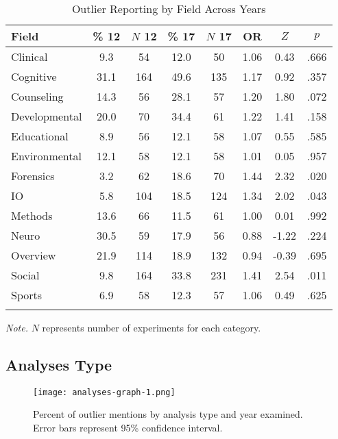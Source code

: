 \documentclass[english,,man]{apa6}
\theoremstyle{definition}
\theoremstyle{definition}
\theoremstyle{definition}
\theoremstyle{remark}
\begin{document}
\begin{table}[tbp]
\begin{center}
\begin{threeparttable}
\caption{\label{tab:info-table}Outlier Reporting by Field Across Years}
\begin{tabular}{lccccccc}
\toprule
Field & \% 12 & $N$ 12 & \% 17 & $N$ 17 & OR & $Z$ & $p$\\
\midrule
Clinical & 9.3 & 54 & 12.0 & 50 & 1.06 & 0.43 & .666\\
Cognitive & 31.1 & 164 & 49.6 & 135 & 1.17 & 0.92 & .357\\
Counseling & 14.3 & 56 & 28.1 & 57 & 1.20 & 1.80 & .072\\
Developmental & 20.0 & 70 & 34.4 & 61 & 1.22 & 1.41 & .158\\
Educational & 8.9 & 56 & 12.1 & 58 & 1.07 & 0.55 & .585\\
Environmental & 12.1 & 58 & 12.1 & 58 & 1.01 & 0.05 & .957\\
Forensics & 3.2 & 62 & 18.6 & 70 & 1.44 & 2.32 & .020\\
IO & 5.8 & 104 & 18.5 & 124 & 1.34 & 2.02 & .043\\
Methods & 13.6 & 66 & 11.5 & 61 & 1.00 & 0.01 & .992\\
Neuro & 30.5 & 59 & 17.9 & 56 & 0.88 & -1.22 & .224\\
Overview & 21.9 & 114 & 18.9 & 132 & 0.94 & -0.39 & .695\\
Social & 9.8 & 164 & 33.8 & 231 & 1.41 & 2.54 & .011\\
Sports & 6.9 & 58 & 12.3 & 57 & 1.06 & 0.49 & .625\\
\bottomrule
\addlinespace
\end{tabular}
\begin{tablenotes}[para]
\normalsize{\textit{Note.} $N$ represents number of experiments for each category.}
\end{tablenotes}
\end{threeparttable}
\end{center}
\end{table}

\subsection{Analyses Type}\label{analyses-type}

\begin{figure}
\centering
\texttt{[image: analyses-graph-1.png]}
\caption{\label{fig:analyses-graph}Percent of outlier mentions by analysis
type and year examined. Error bars represent 95\% confidence interval.}
\end{figure}
\end{document}

